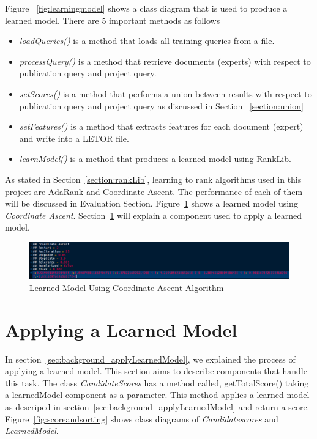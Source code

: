 Figure ~\ref{fig:learningmodel} shows a class diagram that is used to produce a learned model. There are 5 important methods as follows
\begin{itemize}
 \item \textit{loadQueries()} is a method that loads all training queries from a file.
 \item \textit{processQuery()} is a method that retrieve documents (experts) with respect to publication query and project query.
 \item \textit{setScores()} is a method that performs a union between results with respect to publication query and project query as discussed in Section ~\ref{section:union}
 \item \textit{setFeatures()} is a method that extracts features for each document (expert) and write into a LETOR file.
 \item \textit{learnModel()} is a method that produces a learned model using RankLib.
\end{itemize}

As stated in Section~\ref{section:rankLib}, learning to rank algorithms used in this project are AdaRank and Coordinate Ascent. The performance of each
of them will be discussed in Evaluation Section. Figure~\ref{fig:samplemodel} shows a learned model using \textit{Coordinate Ascent}.
Section~\ref{section:applyinglearnedmodel} will explain a component used to apply a learned model.

\begin{figure}
\centering
\includegraphics[scale=0.3]{./figures/samplemodel.png}
\caption{Learned Model Using Coordinate Ascent Algorithm} \label{fig:samplemodel} 
\end{figure}

\section{Applying a Learned Model}\label{section:applyinglearnedmodel}
In section~\ref{sec:background_applyLearnedModel}, we explained the process of applying a learned model. This section aims to describe components
that handle this task. The class \textit{CandidateScores} has a method called, getTotalScore() taking a learnedModel component as a parameter. 
This method applies a learned model as descriped in section~\ref{sec:background_applyLearnedModel} and return a score. Figure~\ref{fig:scoreandsorting}
shows class diagrams of \textit{Candidatescores} and \textit{LearnedModel}.


